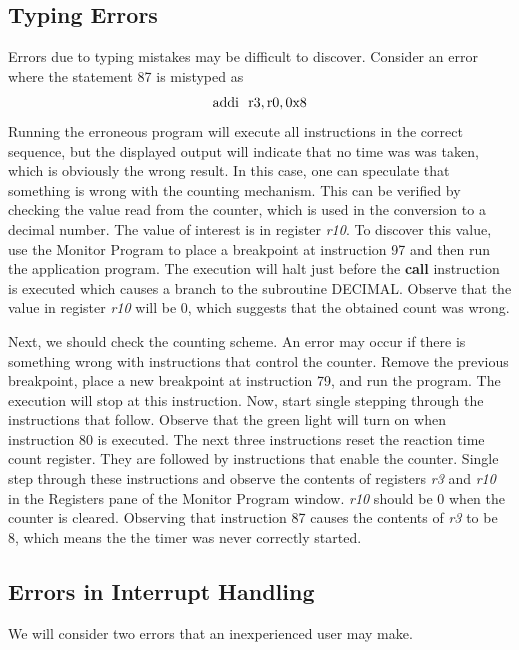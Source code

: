 \documentclass[11pt, twoside, pdftex]{article}
\begin{document}
\subsection{Typing Errors}
Errors due to typing mistakes may be difficult to discover. Consider an error
where the statement 87 is mistyped as
$$
{\rm addi~~r3, r0, 0x8}
$$
\noindent
Running the erroneous program will execute all instructions in the correct sequence,
but the displayed output will indicate that no time was was taken, which is obviously
the wrong result. In this case, one can speculate that something is wrong with the
counting mechanism. This can be verified by checking the value read from the counter,
which is used in the conversion to a decimal number. The value of interest is in
register {\it r10}. To discover this value, use 
the Monitor Program to place a breakpoint at instruction 97 and then run the 
application program. The execution will halt just before the {\bf call} instruction
is executed which causes a branch to the subroutine DECIMAL. Observe that the value
in register {\it r10} will be 0, which suggests that the obtained count was wrong.

Next, we should check the counting scheme. An error may occur if there is something wrong with
instructions that control the counter. Remove the previous breakpoint, place
a new breakpoint at instruction 79, and run the program. The execution will stop
at this instruction. Now, start single stepping through the instructions that follow.
Observe that the green light will turn on when instruction 80 is executed.
The next three instructions reset the reaction time count register. They are followed by
instructions that enable the counter. Single step through these instructions and
observe the contents of registers {\it r3} and {\it r10} in the Registers pane of the Monitor Program 
window. {\it r10} should be 0 when the counter is cleared. Observing that instruction 87 causes the contents of {\it r3} to be 8, which means the the timer was never correctly started.

\subsection{Errors in Interrupt Handling}
We will consider two errors that an inexperienced user may make.
\end{document}
